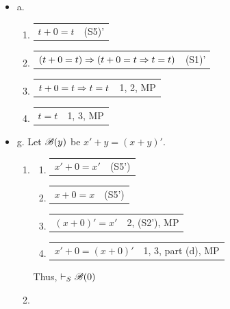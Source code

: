 \begin{itemize}
    \item a. \begin{enumerate} [label=\arabic*.]
        \item \begin{tabular}{p{8cm} r}
            $t+0=t$ & (S5)'
        \end{tabular}
    
        \item \begin{tabular}{p{8cm} r}
            $(t+0=t)\Rightarrow (t+0=t \Rightarrow t=t)$ & (S1)'
        \end{tabular}
        \item \begin{tabular}{p{8cm} r}
            $t+0=t \Rightarrow t=t$ & 1, 2, MP
        \end{tabular}
        \item \begin{tabular}{p{8cm} r}
            $t=t$ & 1, 3, MP
        \end{tabular}
    \end{enumerate}
    \item g. Let $\mathscr{B}(y)$ be $x' + y=(x+y)'$.
        \begin{enumerate} [label=\roman*.]
            \item \begin{enumerate} [label=\arabic*.]
                \item \begin{tabular}{p{8cm} r}
                $x' + 0 = x'$ & (S5')
                \end{tabular}
                \item \begin{tabular}{p{8cm} r}
                $x+0=x$ & (S5')
                \end{tabular}
                \item \begin{tabular}{p{8cm} r}
                $(x+0)'=x'$ & 2, (S2'), MP
                \end{tabular}
                \item \begin{tabular}{p{8cm} r}
                $x'+0=(x+0)'$ & 1, 3, part (d), MP
                \end{tabular}
            \end{enumerate}
            Thus, $\vdash_S \mathscr{B}(0)$
            \item \begin{enumerate} [label=\arabic*.]

\end{enumerate}
\end{enumerate}
\end{itemize}
